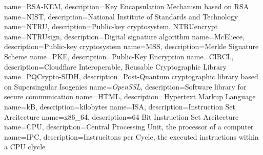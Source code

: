 {
    name=RSA-KEM,
    description={Key Encapsulation Mechanism based on RSA}
}
{
    name=NIST,
    description={National Institute of Standards and Technology}
}
{
    name=NTRU,
    description={Public-key cryptosystem, NTRUencrypt}
}
{
    name=NTRUsign,
    description={Digital signature algorithm}
}
{
    name=McEliece,
    description={Public-key cryptosystem}
}
{
    name=MSS,
    description={Merkle Signature Scheme}
}
{
    name=PKE,
    description={Public-Key Encryption}
}
{
    name=CIRCL,
    description={Cloudflare Interoperable, Reusable Cryptographic Library}
}
{
    name=PQCrypto-SIDH,
    description={Post-Quantum cryptographic library based on Supersingular Isogenies}
}
{
    name=\textit{OpenSSL},
    description={Software library for secure communication}
}
{
    name=HTML,
    description={Hypertext Markup Language}
}
{
    name=kB,
    description={kilobytes}
}
{
    name=ISA,
    description={Instruction Set Arcitecture}
}
{
    name=x86_64,
    description={64 Bit Instruction Set Arcitecture}
}
{
    name=CPU,
    description={Central Processing Unit, the processor of a computer}
}
{
    name=IPC,
    description={Instrucitons per Cycle, the executed instructions within a CPU clycle}
}
